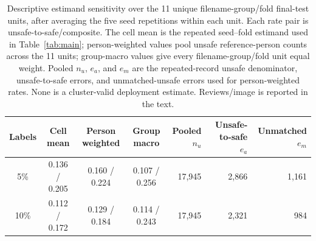\documentclass[iicol,pdflatex,sn-mathphys-num]{sn-jnl}
\begin{document}
\begin{table}[t]
\caption{Descriptive filename-group/fold distribution at the primary operating point after averaging the five seed repetitions within each unit. Entries are median [minimum, maximum] across 11 filename-group/fold units, not confidence intervals. The unit-size columns give median [minimum, maximum] images and unsafe-reference persons. Unsafe-to-safe and Composite use all unsafe reference persons as denominator. Complete worst-first unit rows, group names, denominators, unsafe-to-safe errors, and unmatched-unsafe counts are released with the audit artifact.}
\label{tab:sourcefold}
\centering
\scriptsize
\setlength{\tabcolsep}{4pt}
\end{table}

\begin{table}[t]
\caption{Descriptive estimand sensitivity over the 11 unique filename-group/fold final-test units, after averaging the five seed repetitions within each unit. Each rate pair is unsafe-to-safe/composite. The cell mean is the repeated seed--fold estimand used in Table~\ref{tab:main}; person-weighted values pool unsafe reference-person counts across the 11 units; group-macro values give every filename-group/fold unit equal weight. Pooled $n_u$, $e_a$, and $e_m$ are the repeated-record unsafe denominator, unsafe-to-safe errors, and unmatched-unsafe errors used for person-weighted rates. None is a cluster-valid deployment estimate. Reviews/image is reported in the text.}
\label{tab:estimands}
\centering
\small
\setlength{\tabcolsep}{3pt}
\begin{tabular}{@{}c c c c r r r@{}}
\toprule
Labels & Cell mean & Person weighted & Group macro & Pooled $n_u$ & Unsafe-to-safe $e_a$ & Unmatched $e_m$ \\
\midrule
5\%  & 0.136 / 0.205 & 0.160 / 0.224 & 0.107 / 0.256 & 17,945 & 2,866 & 1,161 \\
10\% & 0.112 / 0.172 & 0.129 / 0.184 & 0.114 / 0.243 & 17,945 & 2,321 & 984 \\
\bottomrule
\end{tabular}
\end{table}
\end{document}
